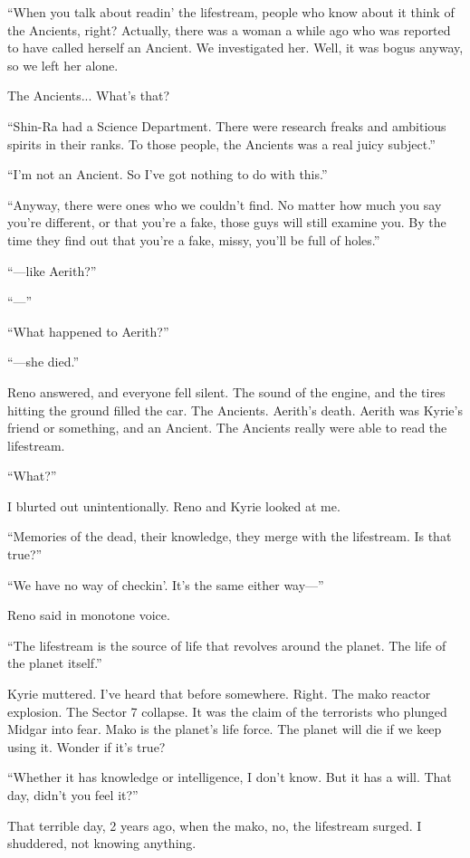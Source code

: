 \documentclass[oneside]{book}
\begin{document}
“When you talk about readin’ the lifestream, people who know about it think of the Ancients, right? Actually, there was a woman a while ago who was reported to have called herself an Ancient. We investigated her. Well, it was bogus anyway, so we left her alone.

The Ancients... What’s that?

“Shin-Ra had a Science Department. There were research freaks and ambitious spirits in their ranks. To those people, the Ancients was a real juicy subject.”

“I’m not an Ancient. So I’ve got nothing to do with this.”

“Anyway, there were ones who we couldn’t find. No matter how much you say you’re different, or that you’re a fake, those guys will still examine you. By the time they find out that you’re a fake, missy, you’ll be full of holes.”

“—like Aerith?”

“—”

“What happened to Aerith?”

“—she died.”

Reno answered, and everyone fell silent. The sound of the engine, and the tires hitting the ground filled the car. The Ancients. Aerith’s death. Aerith was Kyrie’s friend or something, and an Ancient. The Ancients really were able to read the lifestream.

“What?”

I blurted out unintentionally. Reno and Kyrie looked at me.

“Memories of the dead, their knowledge, they merge with the lifestream. Is that true?”

“We have no way of checkin’. It’s the same either way—”

Reno said in monotone voice.

“The lifestream is the source of life that revolves around the planet. The life of the planet itself.”

Kyrie muttered. I’ve heard that before somewhere. Right. The mako reactor explosion. The Sector 7 collapse. It was the claim of the terrorists who plunged Midgar into fear. Mako is the planet’s life force. The planet will die if we keep using it. Wonder if it’s true?

“Whether it has knowledge or intelligence, I don’t know. But it has a will. That day, didn’t you feel it?”

That terrible day, 2 years ago, when the mako, no, the lifestream surged. I shuddered, not knowing anything.
\end{document}
